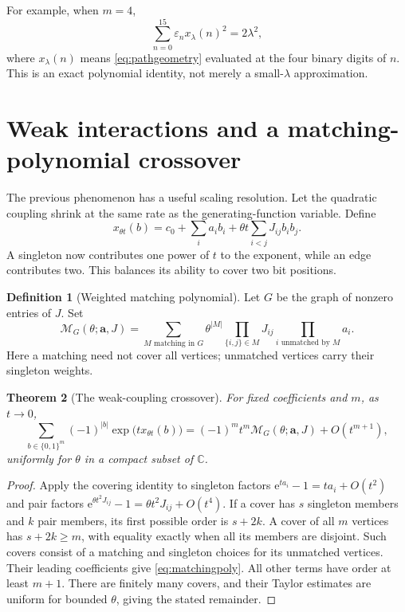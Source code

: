 \documentclass[11pt,oneside]{article}
\numberwithin{equation}{section}
\newtheorem{theorem}{Theorem}[section]
\theoremstyle{definition}
\newtheorem{definition}[theorem]{Definition}
\theoremstyle{remark}
\newcommand{\eps}{\varepsilon}
\newcommand{\CC}{\mathbb C}
\newcommand{\MM}{\mathcal M}
\newcommand{\e}{\mathrm e}
\newcommand{\bits}{\{0,1\}}
\begin{document}
For example, when \(m=4\),
\[
 \sum_{n=0}^{15}\eps_n x_\lambda(n)^2=2\lambda^2,
\]
where \(x_\lambda(n)\) means \eqref{eq:pathgeometry} evaluated at the four
binary digits of \(n\). This is an exact polynomial identity, not merely a
small-\(\lambda\) approximation.

\section{Weak interactions and a matching-polynomial crossover}
\label{sec:crossover}

The previous phenomenon has a useful scaling resolution. Let the quadratic
coupling shrink at the same rate as the generating-function variable. Define
\begin{equation}
 x_{\theta t}(b)=c_0+\sum_i a_i b_i
                  +\theta t\sum_{i<j}J_{ij}b_ib_j.
 \label{eq:scaledgeometry}
\end{equation}
A singleton now contributes one power of \(t\) to the exponent, while an edge
contributes two. This balances its ability to cover two bit positions.

\begin{definition}[Weighted matching polynomial]
Let \(G\) be the graph of nonzero entries of \(J\). Set
\begin{equation}
 \MM_G(\theta;\bm a,J)
 =\sum_{M\text{ matching in }G}
      \theta^{|M|}\prod_{\{i,j\}\in M}J_{ij}
      \prod_{i\text{ unmatched by }M}a_i.
 \label{eq:matchingpoly}
\end{equation}
Here a matching need not cover all vertices; unmatched vertices carry their
singleton weights.
\end{definition}

\begin{theorem}[The weak-coupling crossover]
\label{thm:crossover}
For fixed coefficients and \(m\), as \(t\to0\),
\begin{equation}
 \sum_{b\in\bits^m}(-1)^{|b|}\exp\bigl(t x_{\theta t}(b)\bigr)
 =(-1)^m t^m\MM_G(\theta;\bm a,J)+O(t^{m+1}),
 \label{eq:crossover}
\end{equation}
uniformly for \(\theta\) in a compact subset of \(\CC\).
\end{theorem}
\begin{proof}
Apply the covering identity to singleton factors
\(\e^{ta_i}-1=ta_i+O(t^2)\) and pair factors
\(\e^{\theta t^2J_{ij}}-1=\theta t^2J_{ij}+O(t^4)\).
If a cover has \(s\) singleton members and \(k\) pair members, its first
possible order is \(s+2k\). A cover of all \(m\) vertices has
\(s+2k\ge m\), with equality exactly when all its members are disjoint.
Such covers consist of a matching and singleton choices for its unmatched
vertices. Their leading coefficients give \eqref{eq:matchingpoly}.
All other terms have order at least \(m+1\). There are finitely many covers,
and their Taylor estimates are uniform for bounded \(\theta\), giving the
stated remainder.
\end{proof}
\end{document}
